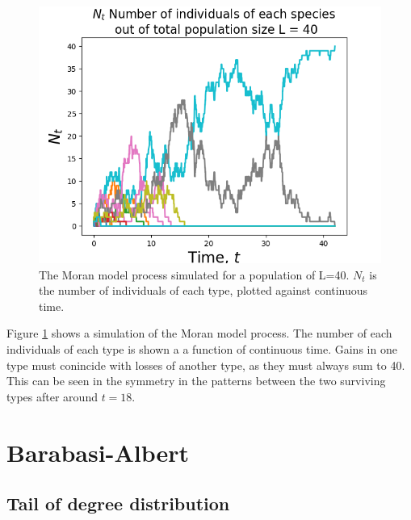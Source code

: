\documentclass{article}
\begin{document}
\begin{figure}[H]
\includegraphics[scale=0.8]{moran_a.png} 
\caption{The Moran model process simulated for a population of L=40. $N_t$ is the number of individuals of each type, plotted against continuous time.} 
\label{fig:moran}
\end{figure}

Figure \ref{fig:moran} shows a simulation of the Moran model process. The number of each individuals of each type is shown a a function of continuous time. Gains in one type must conincide with losses of another type, as they must always sum to 40. This can be seen in the symmetry in the patterns between the two surviving types after around $t=18$.

\section{Barabasi-Albert}

\subsection{Tail of degree distribution}
\end{document}
